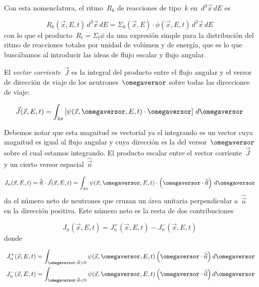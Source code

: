 Con esta nomenclatura, el ritmo~$R_k$ de reacciones de tipo~$k$ en~$d^3\vec{x}\,dE$ es

\begin{equation*}
R_k (\vec{x}, E, t) \, d^3\vec{x} \, dE = \Sigma_k(\vec{x}, E) \cdot \phi(\vec{x}, E, t) \, d^3\vec{x} \, dE
\end{equation*}
%
con lo que el producto~$R_t = \Sigma_t \phi$ da una expresión simple para la distribución del ritmo de reacciones totales por unidad de volúmen y de energía, que es lo que buscábamos al introducir las ideas de flujo escalar y flujo angular.

\begin{definicion}
\label{def:corriente}
El \emph{vector corriente}~$\vec{J}$ es la integral del producto entre el flujo angular y el versor de dirección de viaje de los neutrones~$\omegaversor$ sobre todas las direcciones de viaje:

\label{vectorcorriente}
\begin{equation*}
 \vec{J}(\vec{x},E,t) = \int_{4\pi} \left[ \psi(\vec{x}, \omegaversor, E, t) \cdot \omegaversor \right] \, d\omegaversor
\end{equation*}
\end{definicion}

Debemos notar que esta magnitud es vectorial ya el integrando es un vector cuya magnitud es igual al flujo angular y cuya dirección es la del versor~$\omegaversor$ sobre el cual estamos integrando. El producto escalar entre el vector corriente~$\vec{J}$ y un cierto versor espacial~$\hat{\vec{n}}$

\begin{equation}
\label{eq:jn}
 J_n(\vec{x}, E, t) = \hat{\vec{n}} \cdot \vec{J}(\vec{x}, E, t) = \int_{4\pi} \psi(\vec{x}, \omegaversor, E, t) \cdot \left( \omegaversor \cdot \hat{\vec{n}} \right) \, d\omegaversor
\end{equation}
%
da el número neto de neutrones que cruzan un área unitaria perpendicular a~$\hat{\vec{n}}$ en la dirección positiva. Este número neto es la resta de dos contribuciones

\begin{equation*}
 J_n(\vec{x}, E, t) = J_n^+(\vec{x}, E, t) - J_n^-(\vec{x}, E, t)
\end{equation*}
%
donde

\begin{align}
 J_n^+(\vec{x},E,t) &= \int_{\omegaversor \cdot \hat{\vec{n}} > 0} \psi(\vec{x}, \omegaversor, E, t) \left(\omegaversor \cdot \hat{\vec{n}}\right) d\omegaversor \nonumber \\
\ J_n^-(\vec{x},E,t) &= \int_{\omegaversor \cdot \hat{\vec{n}} < 0} \psi(\vec{x}, \omegaversor, E, t) \left(\omegaversor \cdot \hat{\vec{n}}\right) d\omegaversor \label{eq:jnegativa}
\end{align}

